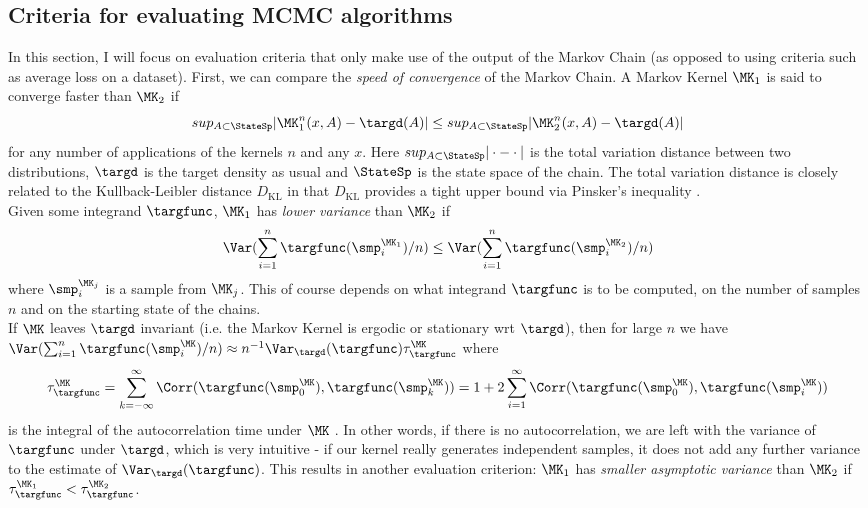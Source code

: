 \subsection{Criteria for evaluating MCMC algorithms}
\label{sec:criteria_mcmc}
In this section, I will focus on evaluation criteria that only make use of the output of the Markov Chain (as opposed to using criteria such as average loss on a dataset). First, we can compare the \emph{speed of convergence} of the Markov Chain. A Markov Kernel $\MK_1$ is said to converge faster than $\MK_2$ if
$$sup_{A\subset \StateSp} |\MK^n_1(x,A)-\targd(A)| \leq sup_{A\subset \StateSp} |\MK^n_2(x,A)-\targd(A)| $$
for any number of applications of the kernels $n$ and any $x$. Here $sup_{A\subset \StateSp} |\cdot - \cdot|$ is the total variation distance between two distributions, $\targd$ is the target density as usual and $\StateSp$ is the state space of the chain. The total variation distance is closely related to the Kullback-Leibler distance $D_\textrm{KL}$ in that $D_\textrm{KL}$ provides a tight upper bound via Pinsker's inequality  \citep[see Lemma 2.5 in][]{Tsybakov2008}.\\
Given some integrand $\targfunc$, $\MK_1$ has \emph{lower variance} than $\MK_2$ if
$$\Var(\sum_{i=1}^n \targfunc(\smp^{\MK_1}_i)/n) \leq \Var(\sum_{i=1}^n \targfunc(\smp^{\MK_2}_i)/n)$$
where $\smp^{\MK_j}_i$ is a sample from $\MK_j$. This of course depends on what integrand $\targfunc$ is to be computed, on the number of samples $n$ and on the starting state of the chains.\\
If $\MK$ leaves $\targd$ invariant (i.e. the Markov Kernel is ergodic or stationary wrt $\targd$), then for large $n$ we have $\Var(\sum_{i=1}^n \targfunc(\smp^{\MK}_i)/n) \approx n^{-1}\Var_\targd(\targfunc) \tau_{\targfunc}^\MK$ where 
$$\tau_{\targfunc}^\MK = \sum_{k=-\infty}^\infty \Corr(\targfunc(\smp^\MK_0),\targfunc(\smp^\MK_k)) = 1+2 \sum_{i=1}^\infty \Corr(\targfunc(\smp^\MK_0),\targfunc(\smp^\MK_i))$$ is the integral of the autocorrelation time under $\MK$ . In other words, if there is no autocorrelation, we are left with the variance of $\targfunc$ under $\targd$, which is very intuitive - if our kernel really generates independent samples, it does not add any further variance to the estimate of $\Var_\targd(\targfunc)$. This results in another evaluation criterion: $\MK_1$ has \emph{smaller asymptotic variance} than $\MK_2$ if $\tau_{\targfunc}^{\MK_1} < \tau_{\targfunc}^{\MK_2}$.\\
